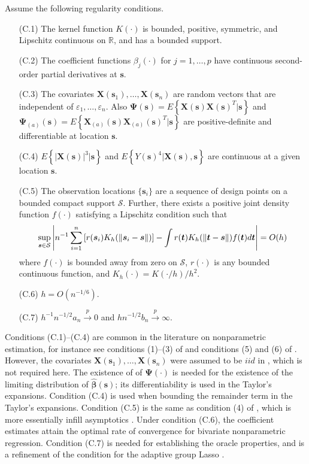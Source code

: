 \documentclass[authoryear,review, 12pt]{elsarticle}
\begin{document}
Assume the following regularity conditions.
\begin{itemize}
\item[(C.1)] The kernel function $K(\cdot)$ is bounded, positive, symmetric,
and Lipschitz continuous on $\mathbb{R}$, and has a bounded support.
\item[(C.2)] The coefficient functions $ $$\beta_{j}(\cdot)$ for $j=1,\dots,p$
have continuous second-order partial derivatives at $\bm{s}$.
\item[(C.3)] The covariates $\bm{X}(\bm{s}_{1}),\dots,\bm{X}(\bm{s}_{n})$ are
random vectors that are independent of $\varepsilon_{1},\dots,\varepsilon_{n}$.
Also $\bm{\Psi}(\bm{s})=E\left\{ \bm{X}(\bm{s})\bm{X}(\bm{s})^{T}|\bm{s}\right\} $
and $\bm{\Psi}_{(a)}(\bm{s})=E\left\{ \bm{X}_{(a)}(\bm{s})\bm{X}_{(a)}(\bm{s})^{T}|\bm{s}\right\} $
are positive-definite and differentiable at location $\bm{s}$.
\item[(C.4)] $E\left\{ \left|\bm{X}(\bm{s})\right|^{3}|\bm{s}\right\} $ and $E\left\{ Y(\bm{s})^{4}|\bm{X}(\bm{s}),\bm{s}\right\} $
are continuous at a given location $\bm{s}$.
\item[(C.5)] The observation locations $\{\bm{s}_{i}\}$ are a sequence of
design points on a bounded compact support $\mathcal{S}$. Further,
there exists a positive joint density function $f(\cdot)$ satisfying
a Lipschitz condition such that 
\[
\sup_{\bm{s}\text{\ensuremath{\in}}\mathcal{S}}\left|n^{-1}\sum_{i=1}^{n}\left[r(\bm{s}_{i})K_{h}(\|\bm{s}_{i}-\bm{s}\|)\right]-\int r(\bm{t})K_{h}(\|\bm{t}-\bm{s}\|)f(\bm{t})d\bm{t}\right|=O(h)
\]
where $f(\cdot)$ is bounded away from zero on $\mathcal{S}$, $r(\cdot)$
is any bounded continuous function, and $K_{h}(\cdot)=K(\cdot/h)/h^{2}$.
\item[(C.6)] $h=O\left(n^{-1/6}\right)$.
\item[(C.7)] $h^{-1}n^{-1/2}a_{n}\xrightarrow{p}0$ and $hn^{-1/2}b_{n}\xrightarrow{p}\infty$.
\end{itemize}
Conditions (C.1)--(C.4) are common in the literature on nonparametric
estimation, for instance see conditions (1)--(3) of \citet{Sun-Yan-Zhang-Lu-2014}
and conditions (5) and (6) of \citet{Cai-Fan-Li-2000}. However, the
covariates $\bm{X}(\bm{s}_{1}),\dots,\bm{X}(\bm{s}_{n})$ were assumed
to be $iid$ in \citet{Sun-Yan-Zhang-Lu-2014}, which is not required
here. The existence of of $\bm{\Psi}(\cdot)$ is needed for the existence
of the limiting distribution of $\hat{\bm{\beta}}(\bm{s})$; its differentiability
is used in the Taylor's expansions. Condition (C.4) is used when bounding
the remainder term in the Taylor's expansions. Condition (C.5) is
the same as condition (4) of \citet{Sun-Yan-Zhang-Lu-2014}, which
is more essentially infill asymptotics \citep{Cressie-1993}. Under condition (C.6), the coefficient estimates attain the optimal
rate of convergence for bivariate nonparametric regression. Condition
(C.7) is needed for establishing the oracle properties, and is a refinement
of the condition for the adaptive group Lasso \citep{Wang-Leng-2008}.
\end{document}
